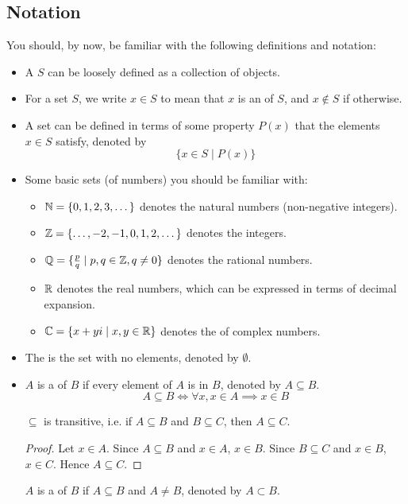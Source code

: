\subsection{Notation}
You should, by now, be familiar with the following definitions and notation:
\begin{itemize}
\item A  $S$ can be loosely defined as a collection of objects.

\item For a set $S$, we write $x \in S$ to mean that $x$ is an  of $S$, and $x \notin S$ if otherwise.

\item A set can be defined in terms of some property $P(x)$ that the elements $x \in S$ satisfy, denoted by 
\[ \{x \in S \mid P(x)\} \]

\item Some basic sets (of numbers) you should be familiar with:
\begin{itemize}
\item $\mathbb N=\{0,1,2,3,\dots\}$ denotes the natural numbers (non-negative integers).
\item $\mathbb Z=\{\dots,-2,-1,0,1,2,\dots\}$ denotes the integers.
\item $\mathbb Q=\{\frac{p}{q} \mid p,q\in\mathbb Z, q\neq0\}$ denotes the rational numbers.
\item $\mathbb R$ denotes the real numbers, which can be expressed in terms of decimal expansion.
\item $\mathbb C=\{x+yi \mid x,y\in\mathbb R\}$ denotes the of complex numbers.
\end{itemize}

\item The  is the set with no elements, denoted by $\emptyset$.

\item $A$ is a  of $B$ if every element of $A$ is in $B$, denoted by $A \subseteq B$.
\[ A \subseteq B \iff \forall x, x\in A \implies x\in B \]

$\subseteq$ is transitive, i.e. if $A \subseteq B$ and $B \subseteq C$, then $A \subseteq C$.
\begin{proof}
Let $x\in A$. 
Since $A \subseteq B$ and $x\in A$, $x\in B$. 
Since $B \subseteq C$ and $x\in B$, $x\in C$. 
Hence $A \subseteq C$.
\end{proof}

$A$ is a  of $B$ if $A \subseteq B$ and $A \neq B$, denoted by $A \subset B$.


\end{itemize}
